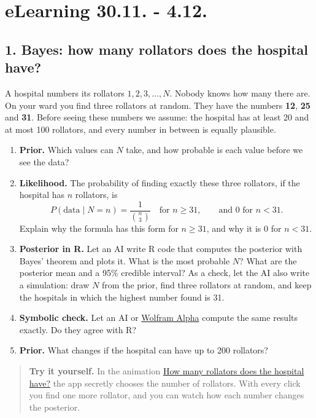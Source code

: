 \documentclass[
]{book}
\begin{document}
\chapter*{eLearning 30.11. - 4.12.}\label{elearning_30_11}

\section*{1. Bayes: how many rollators does the hospital have?}\label{bayes-how-many-rollators-does-the-hospital-have}

A hospital numbers its rollators \(1, 2, 3, \dots, N\). Nobody knows how many there are.
On your ward you find three rollators at random. They have the numbers \textbf{12}, \textbf{25} and \textbf{31}.
Before seeing these numbers we assume: the hospital has at least 20 and at most 100 rollators,
and every number in between is equally plausible.

\begin{enumerate}
\def\labelenumi{\alph{enumi})}
\item
  \textbf{Prior.} Which values can \(N\) take, and how probable is each value before we see the data?
\item
  \textbf{Likelihood.} The probability of finding exactly these three rollators, if the hospital has \(n\) rollators, is
  \[P(\text{data} \mid N = n) = \frac{1}{\binom{n}{3}} \quad \text{for } n \ge 31, \qquad \text{and 0 for } n < 31.\]
  Explain why the formula has this form for \(n \ge 31\), and why it is 0 for \(n < 31\).
\item
  \textbf{Posterior in R.} Let an AI write R code that computes the posterior with Bayes' theorem and plots it.
  What is the most probable \(N\)? What are the posterior mean and a 95\% credible interval?
  As a check, let the AI also write a simulation: draw \(N\) from the prior, find three rollators at random,
  and keep the hospitals in which the highest number found is 31.
\item
  \textbf{Symbolic check.} Let an AI or \href{https://www.wolframalpha.com}{Wolfram Alpha} compute the same results exactly.
  Do they agree with R?
\item
  \textbf{Prior.} What changes if the hospital can have up to 200 rollators?
\end{enumerate}

\begin{quote}
\textbf{Try it yourself.} In the animation
\href{https://jdegenfellner.github.io/Script_QM1_ZHAW/animations/27_Rollatoren_German_Tank.html}{How many rollators does the hospital have?}
the app secretly chooses the number of rollators. With every click you find one more rollator,
and you can watch how each number changes the posterior.
\end{quote}
\end{document}
